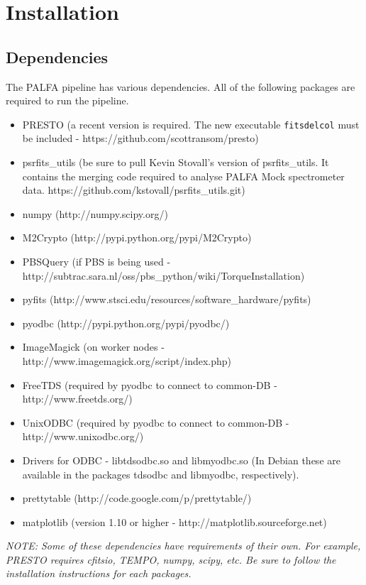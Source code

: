 \documentclass[12pt]{article}
\begin{document}
\section{Installation}
\subsection{Dependencies}
The PALFA pipeline has various dependencies. All of the following packages are required to run the pipeline.
\begin{itemize}
    \item PRESTO (a recent version is required. The new executable \texttt{fitsdelcol} must be included - https://github.com/scottransom/presto)
    \item psrfits\_utils (be sure to pull Kevin Stovall's version of psrfits\_utils. It contains the merging code required to analyse PALFA Mock spectrometer data. https://github.com/kstovall/psrfits\_utils.git)
    \item numpy (http://numpy.scipy.org/)
    \item M2Crypto (http://pypi.python.org/pypi/M2Crypto)
    \item PBSQuery (if PBS is being used - http://subtrac.sara.nl/oss/pbs\_python/wiki/TorqueInstallation)
    \item pyfits (http://www.stsci.edu/resources/software\_hardware/pyfits)
    \item pyodbc (http://pypi.python.org/pypi/pyodbc/)
    \item ImageMagick (on worker nodes - http://www.imagemagick.org/script/index.php)
    \item FreeTDS (required by pyodbc to connect to common-DB - http://www.freetds.org/)
    \item UnixODBC (required by pyodbc to connect to common-DB - http://www.unixodbc.org/)
    \item Drivers for ODBC - libtdsodbc.so and libmyodbc.so (In Debian these are available in the packages tdsodbc and libmyodbc, respectively).
    \item prettytable (http://code.google.com/p/prettytable/)
    \item matplotlib (version 1.10 or higher - http://matplotlib.sourceforge.net)
\end{itemize}

\textit{NOTE: Some of these dependencies have requirements of their own. For example, PRESTO requires cfitsio, TEMPO, numpy, scipy, etc. Be sure to follow the installation instructions for each packages.}
\end{document}

